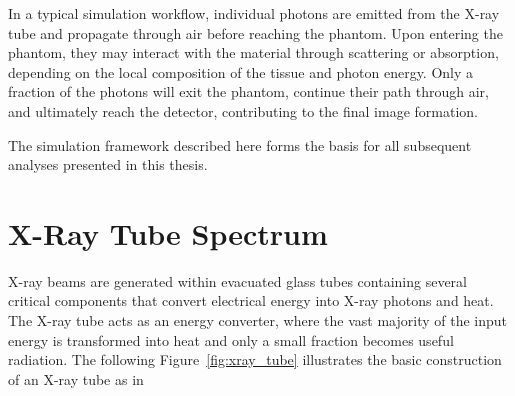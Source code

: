 In a typical simulation workflow, individual photons are emitted from the X-ray
tube and propagate through air before reaching the phantom. Upon entering the
phantom, they may interact with the material through scattering or absorption,
depending on the local composition of the tissue and photon energy. Only a
fraction of the photons will exit the phantom, continue their path through air,
and ultimately reach the detector, contributing to the final image formation.

The simulation framework described here forms the basis for all subsequent
analyses presented in this thesis.


\section{X-Ray Tube Spectrum}
\label{sec:xray_tube_spectrum}

X-ray beams are generated within evacuated glass tubes containing several
critical components that convert electrical energy into X-ray photons and heat.
The X-ray tube acts as an energy converter, where the vast majority of the input
energy is transformed into heat and only a small fraction becomes useful
radiation. The following Figure~\ref{fig:xray_tube} illustrates the basic
construction of an X-ray tube as in \cite{poludniowski2022calculating}

